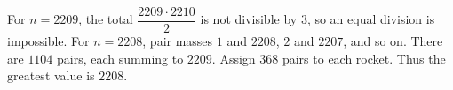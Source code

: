 For $n=2209$, the total $\dfrac{2209\cdot2210}{2}$ is not divisible by $3$, so an equal division is impossible. For $n=2208$, pair masses $1$ and $2208$, $2$ and $2207$, and so on. There are $1104$ pairs, each summing to $2209$. Assign $368$ pairs to each rocket. Thus the greatest value is $\boxed{2208}$.
